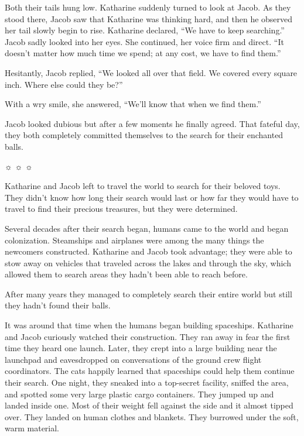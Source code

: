 Both their tails hung low. Katharine suddenly turned to look at Jacob. As they stood there, Jacob saw that Katharine was thinking hard, and then he observed her tail slowly begin to rise. Katharine declared, “We have to keep searching.” Jacob sadly looked into her eyes. She continued, her voice firm and direct. “It doesn't matter how much time we spend; at any cost, we have to find them.”

Hesitantly, Jacob replied, “We looked all over that field. We covered every square inch. Where else could they be?”

With a wry smile, she answered, “We'll know that when we find them.”

Jacob looked dubious but after a few moments he finally agreed. That fateful day, they both completely committed themselves to the search for their enchanted balls.



{\small \begin{center}
		☼ ☼ ☼
\end{center}}



Katharine and Jacob left to travel the world to search for their beloved toys. They didn't know how long their search would last or how far they would have to travel to find their precious treasures, but they were determined.

Several decades after their search began, humans came to the world and began colonization. Steamships and airplanes were among the many things the newcomers constructed. Katharine and Jacob took advantage; they were able to stow away on vehicles that traveled across the lakes and through the sky, which allowed them to search areas they hadn't been able to reach before.

After many years they managed to completely search their entire world but still they hadn't found their balls.

It was around that time when the humans began building spaceships. Katharine and Jacob curiously watched their construction. They ran away in fear the first time they heard one launch. Later, they crept into a large building near the launchpad and eavesdropped on conversations of the ground crew flight coordinators. The cats happily learned that spaceships could help them continue their search. One night, they sneaked into a top-secret facility, sniffed the area, and spotted some very large plastic cargo containers. They jumped up and landed inside one. Most of their weight fell against the side and it almost tipped over. They landed on human clothes and blankets. They burrowed under the soft, warm material.


